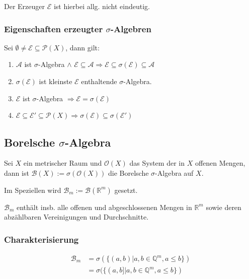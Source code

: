 Der Erzeuger $\mathcal{E}$ ist hierbei allg. nicht eindeutig.

\subsubsection*{Eigenschaften erzeugter $\sigma$-Algebren}

Sei $\emptyset \neq \mathcal{E} \subseteq \mathcal{P}(X)$, dann gilt:

\begin{enumerate}[label=(\alph*)]
	\item $\mathcal{A}$ ist $\sigma$-Algebra $\land$ $\mathcal{E} \subseteq \mathcal{A} \Rightarrow \mathcal{E} \subseteq \sigma(\mathcal{E}) \subseteq \mathcal{A}$
	\item $\sigma(\mathcal{E})$ ist kleinste $\mathcal{E}$ enthaltende $\sigma$-Algebra.
	\item $\mathcal{E}$ ist $\sigma$-Algebra $\Rightarrow \mathcal{E} = \sigma(\mathcal{E})$
	\item $\mathcal{E} \subseteq \mathcal{E}' \subseteq \mathcal{P}(X) \Rightarrow \sigma(\mathcal{E}) \subseteq \sigma(\mathcal{E}')$
\end{enumerate}

\subsection*{Borelsche $\sigma$-Algebra}

Sei $X$ ein metrischer Raum und $\mathcal{O}(X)$ das System der in $X$ offenen Mengen, dann ist $\mathcal{B}(X) := \sigma(\mathcal{O}(X))$ die Borelsche $\sigma$-Algebra auf $X$.

Im Speziellen wird $\mathcal{B}_m := \mathcal{B}(\mathbb{R}^m)$ gesetzt.

$\mathcal{B}_m$ enthält insb. alle offenen und abgeschlossenen Mengen in $\mathbb{R}^m$ sowie deren abzählbaren Vereinigungen und Durchschnitte.

\subsubsection*{Charakterisierung}

\vspace*{-4mm}
\begin{align*}
	\mathcal{B}_m &= \sigma(\{(a, b) | a, b \in \mathbb{Q}^m, a \leq b\}) \\
	              &= \sigma(\{(a, b] | a, b \in \mathbb{Q}^m, a \leq b\})
\end{align*}

